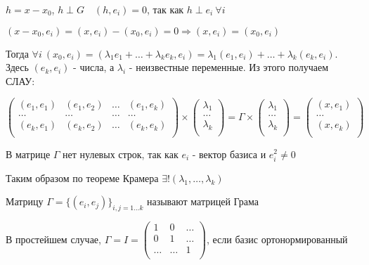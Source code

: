 \documentclass[12pt]{article}
\begin{document}
    $h = x - x_0$, $h \perp G \quad (h, e_i) = 0$, так как $h \perp e_i \ \forall i$

    $(x - x_0, e_i) = (x, e_i) - (x_0, e_i) = 0 \Longrightarrow (x, e_i) = (x_0, e_i)$

    Тогда $\forall i \ (x_0, e_i) = (\lambda_1 e_1 + \dots + \lambda_k e_k, e_i) = \lambda_1 (e_1, e_i) + \dots + \lambda_k (e_k, e_i)$. 
    Здесь $(e_k, e_i)$ - числа, а $\lambda_i$ - неизвестные переменные. Из этого получаем СЛАУ:

    $\begin{pmatrix}
    (e_1, e_1) & (e_1, e_2) & \ldots & (e_1, e_k)\\
    \ldots & \ldots & \ldots & \ldots\\
    (e_k, e_1) & (e_k, e_2) & \ldots & (e_k, e_k)\\
    \end{pmatrix} \times 
    \begin{pmatrix}
    \lambda_1\\
    \ldots\\
    \lambda_k \\
    \end{pmatrix} = \Gamma \times \begin{pmatrix}
    \lambda_1\\
    \ldots\\
    \lambda_k \\
    \end{pmatrix} = \begin{pmatrix}
    (x,e_1)\\
    \ldots\\
    (x,e_k) \\
    \end{pmatrix}$

    \Nota В матрице $\Gamma$ нет нулевых строк, так как $e_i$ - вектор базиса и $e_i^2 \neq 0$

    Таким образом по теореме Крамера $\exists! (\lambda_1, \dots, \lambda_k)$

    \hypertarget{grammatrix}{}

    \Def Матрицу $\Gamma = \{(e_i, e_j)\}_{i, j = 1\dots k}$ называют матрицей Грама

    \smallvspace

    В простейшем случае, $\Gamma = I = \begin{pmatrix}
    1 & 0 & \ldots\\
    0 & 1 & \ldots\\
    \ldots & \ldots & 1\\
    \end{pmatrix}$, если базис ортонормированный
\end{document}
